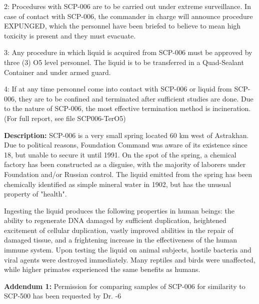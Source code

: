 2: Procedures with SCP-006 are to be carried out under extreme surveillance. In case of contact with SCP-006, the commander in charge will announce procedure \lb EXPUNGED\rb, which the personnel have been briefed to believe to mean high toxicity is present and they must evacuate.

3: Any procedure in which liquid is acquired from SCP-006 must be approved by three (3) O5 level personnel. The liquid is to be transferred in a Quad-Sealant Container and under armed guard.

4: If at any time personnel come into contact with SCP-006 or liquid from SCP-006, they are to be confined and terminated after sufficient studies are done. Due to the nature of SCP-006, the most effective termination method is incineration. (For full report, see file SCP006-TerO5)

\textbf{Description:} SCP-006 is a very small spring located 60 km west of Astrakhan. Due to political reasons, Foundation Command was aware of its existence since 18, but unable to secure it until 1991. On the spot of the spring, a chemical factory has been constructed as a disguise, with the majority of laborers under Foundation and/or Russian control. The liquid emitted from the spring has been chemically identified as simple mineral water in 1902, but has the unusual property of "health".

Ingesting the liquid produces the following properties in human beings: the ability to regenerate DNA damaged by sufficient duplication, heightened excitement of cellular duplication, vastly improved abilities in the repair of damaged tissue, and a frightening increase in the effectiveness of the human immune system. Upon testing the liquid on animal subjects, hostile bacteria and viral agents were destroyed immediately. Many reptiles and birds were unaffected, while higher primates experienced the same benefits as humans.

\textbf{Addendum 1:} Permission for comparing samples of SCP-006 for similarity to SCP-500 has been requested by Dr. -6